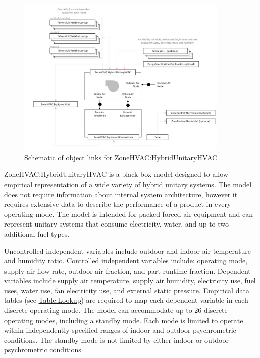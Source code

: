 \begin{figure}[hbtp]
\centering
\includegraphics[width=0.9\textwidth, height=0.9\textheight, keepaspectratio=true]{media/hybrid001.jpg}
\caption{Schematic of object links for ZoneHVAC:HybridUnitaryHVAC \protect \label{fig:hybrid001}}
\end{figure}

ZoneHVAC:HybridUnitaryHVAC is a black-box model designed to allow empirical representation of a wide variety of hybrid unitary systems. The model does not require information about internal system architecture, however it requires extensive data to describe the performance of a product in every operating mode. The model is intended for packed forced air equipment and can represent unitary systems that consume electricity, water, and up to two additional fuel types.

Uncontrolled independent variables include outdoor and indoor air temperature and humidity ratio. Controlled independent variables include: operating mode, supply air flow rate, outdoor air fraction, and part runtime fraction. Dependent variables include supply air temperature, supply air humidity, electricity use, fuel uses, water use, fan electricity use, and external static pressure. Empirical data tables (see \hyperref[tablelookup]{Table:Lookup}) are required to map each dependent variable in each discrete operating mode. The model can accommodate up to 26 discrete operating modes, including a standby mode. Each mode is limited to operate within independently specified ranges of indoor and outdoor psychrometric conditions.  The standby mode is not limited by either indoor or outdoor psychrometric conditions.

